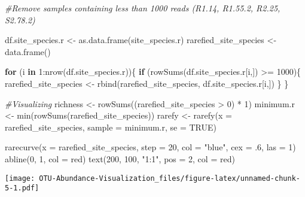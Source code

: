 \documentclass[
]{article}
\newenvironment{Shaded}{\begin{snugshade}}{\end{snugshade}}
\newcommand{\AttributeTok}[1]{\textcolor[rgb]{0.77,0.63,0.00}{#1}}
\newcommand{\CommentTok}[1]{\textcolor[rgb]{0.56,0.35,0.01}{\textit{#1}}}
\newcommand{\ConstantTok}[1]{\textcolor[rgb]{0.00,0.00,0.00}{#1}}
\newcommand{\ControlFlowTok}[1]{\textcolor[rgb]{0.13,0.29,0.53}{\textbf{#1}}}
\newcommand{\DecValTok}[1]{\textcolor[rgb]{0.00,0.00,0.81}{#1}}
\newcommand{\FunctionTok}[1]{\textcolor[rgb]{0.00,0.00,0.00}{#1}}
\newcommand{\NormalTok}[1]{#1}
\newcommand{\OtherTok}[1]{\textcolor[rgb]{0.56,0.35,0.01}{#1}}
\newcommand{\SpecialCharTok}[1]{\textcolor[rgb]{0.00,0.00,0.00}{#1}}
\newcommand{\StringTok}[1]{\textcolor[rgb]{0.31,0.60,0.02}{#1}}
\begin{document}
\begin{Shaded}
\begin{Highlighting}[]
\CommentTok{\#Remove samples containing less than 1000 reads (R1.14, R1.55.2, R2.25, S2.78.2)}

\NormalTok{df.site\_species.r }\OtherTok{\textless{}{-}} \FunctionTok{as.data.frame}\NormalTok{(site\_species.r)}
\NormalTok{rarefied\_site\_species }\OtherTok{\textless{}{-}} \FunctionTok{data.frame}\NormalTok{()}

\ControlFlowTok{for}\NormalTok{ (i }\ControlFlowTok{in} \DecValTok{1}\SpecialCharTok{:}\FunctionTok{nrow}\NormalTok{(df.site\_species.r))\{}
  \ControlFlowTok{if}\NormalTok{ (}\FunctionTok{rowSums}\NormalTok{(df.site\_species.r[i,]) }\SpecialCharTok{\textgreater{}=} \DecValTok{1000}\NormalTok{)\{}
\NormalTok{    rarefied\_site\_species }\OtherTok{\textless{}{-}} \FunctionTok{rbind}\NormalTok{(rarefied\_site\_species, df.site\_species.r[i,])}
\NormalTok{  \}}
\NormalTok{\}}

\CommentTok{\#Visualizing}
\NormalTok{richness }\OtherTok{\textless{}{-}} \FunctionTok{rowSums}\NormalTok{((rarefied\_site\_species }\SpecialCharTok{\textgreater{}} \DecValTok{0}\NormalTok{) }\SpecialCharTok{*} \DecValTok{1}\NormalTok{)}
\NormalTok{minimum.r }\OtherTok{\textless{}{-}} \FunctionTok{min}\NormalTok{(}\FunctionTok{rowSums}\NormalTok{(rarefied\_site\_species))}
\NormalTok{rarefy }\OtherTok{\textless{}{-}} \FunctionTok{rarefy}\NormalTok{(}\AttributeTok{x =}\NormalTok{ rarefied\_site\_species, }\AttributeTok{sample =}\NormalTok{ minimum.r, }\AttributeTok{se =} \ConstantTok{TRUE}\NormalTok{)}

\FunctionTok{rarecurve}\NormalTok{(}\AttributeTok{x =}\NormalTok{ rarefied\_site\_species, }\AttributeTok{step =} \DecValTok{20}\NormalTok{, }\AttributeTok{col =} \StringTok{"blue"}\NormalTok{, }\AttributeTok{cex =}\NormalTok{ .}\DecValTok{6}\NormalTok{, }\AttributeTok{las =} \DecValTok{1}\NormalTok{)}
\FunctionTok{abline}\NormalTok{(}\DecValTok{0}\NormalTok{, }\DecValTok{1}\NormalTok{, }\AttributeTok{col =} \StringTok{\textquotesingle{}red\textquotesingle{}}\NormalTok{)}
\FunctionTok{text}\NormalTok{(}\DecValTok{200}\NormalTok{, }\DecValTok{100}\NormalTok{, }\StringTok{"1:1"}\NormalTok{, }\AttributeTok{pos =} \DecValTok{2}\NormalTok{, }\AttributeTok{col =} \StringTok{\textquotesingle{}red\textquotesingle{}}\NormalTok{)}
\end{Highlighting}
\end{Shaded}

\texttt{[image: OTU-Abundance-Visualization\_files/figure-latex/unnamed-chunk-5-1.pdf]}
\end{document}
